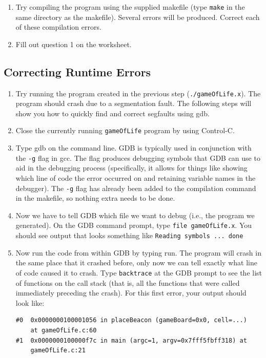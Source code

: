 \documentclass[12pt]{scrartcl}
\begin{document}
\begin{enumerate}
  \item Try compiling the program using the supplied makefile (type 
	\texttt{make} in the same directory as the makefile).  
	Several errors will be produced.  Correct each of these compilation 
	errors.
  \item Fill out question 1 on the worksheet.
\end{enumerate}

\subsection{Correcting Runtime Errors}

\begin{enumerate}
  \item Try running the program created in the previous step 
  	(\texttt{./gameOfLife.x}).  The program should crash due 
	to a segmentation fault.  The following steps will show you how 
	to quickly find and correct segfaults using gdb.  
  \item Close the currently running \texttt{gameOfLife} program 
	by using Control-C.
  \item Type gdb on the command line.  GDB is typically used in 
  	conjunction with the \texttt{-g} flag in gcc.  The flag 
	produces debugging symbols that GDB can use to aid in the 
	debugging process (specifically, it allows for things like showing 
	which line of code the error occurred on and retaining variable names 
	in the debugger).  The \texttt{-g} flag has already been added 
	to the compilation command in the makefile, so nothing extra needs to be done.
  \item Now we have to tell GDB which file we want to debug (i.e., the program 
	we generated).  On the GDB command prompt, type \texttt{file gameOfLife.x}.  
	You should see output that looks something like \texttt{Reading symbols ... done}
  \item Now run the code from within GDB by typing run.  The program will 
	crash in the same place that it crashed before, only now we can tell exactly 
	what line of code caused it to crash.  Type \texttt{backtrace} at the GDB prompt 
	to see the list of functions on the call stack (that is, all the functions that 
	were called immediately preceding the crash).  For this first error, your 
	output should look like:

\begin{verbatim}
#0  0x0000000100001056 in placeBeacon (gameBoard=0x0, cell=...) 
	at gameOfLife.c:60
#1  0x0000000100000f7c in main (argc=1, argv=0x7fff5fbff318) at 
	gameOfLife.c:21
\end{verbatim}


\end{enumerate}
\end{document}
